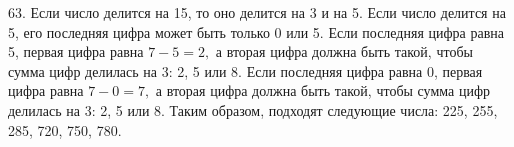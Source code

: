 63. Если число делится на 15, то оно делится на 3 и на 5. Если число делится на 5, его последняя цифра может быть только 0 или 5. Если последняя цифра равна 5, первая цифра равна $7-5=2,$ а вторая цифра должна быть такой, чтобы сумма цифр делилась на 3: 2, 5 или 8. Если последняя цифра равна 0, первая цифра равна $7-0=7,$ а вторая цифра должна быть такой, чтобы сумма цифр делилась на 3: 2, 5 или 8. Таким образом, подходят следующие числа: 225, 255, 285, 720, 750, 780.\\
